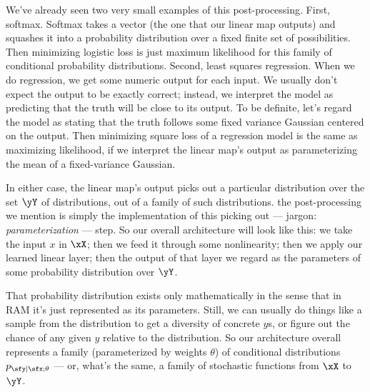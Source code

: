We've already seen two very small examples of this post-processing.  First,
softmax.  Softmax takes a vector (the one that our linear map outputs) and
squashes it into a probability distribution over a fixed finite set of
possibilities.  Then minimizing logistic loss is just maximum likelihood for
this family of conditional probability distributions.  Second, least squares
regression.  When we do regression, we get some numeric output for each input.
We usually don't expect the output to be exactly correct; instead, we interpret
the model as predicting that the truth will be close to its output.  To be
definite, let's regard the model as stating that the truth follows some fixed
variance Gaussian centered on the output.  Then minimizing square loss of a
regression model is the same as maximizing likelihood, if we interpret the
linear map's output as parameterizing the mean of a fixed-variance Gaussian.

In either case, the linear map's output picks out a particular distribution
over the set $\yY$ of distributions, out of a family of such distributions.
the post-processing we mention is simply the implementation of this picking out
--- jargon: \emph{parameterization} --- step.  So our overall architecture will
look like this: we take the input $x$ in $\xX$; then we feed it through some nonlinearity;
then we apply our learned linear layer; then the output of that layer we regard
as the parameters of some probability distribution over $\yY$.

That probability distribution exists only mathematically in the sense that in
RAM it's just represented as its parameters.  Still, we can usually do things
like a sample from the distribution to get a diversity of concrete $y$s, or
figure out the chance of any given $y$ relative to the distribution.  So our
architecture overall represents a family (parameterized by weights $\theta$) of
conditional distributions $p_{\sfy|\sfx;\theta}$ --- or, what's the same, a family
of stochastic functions from $\xX$ to $\yY$.


